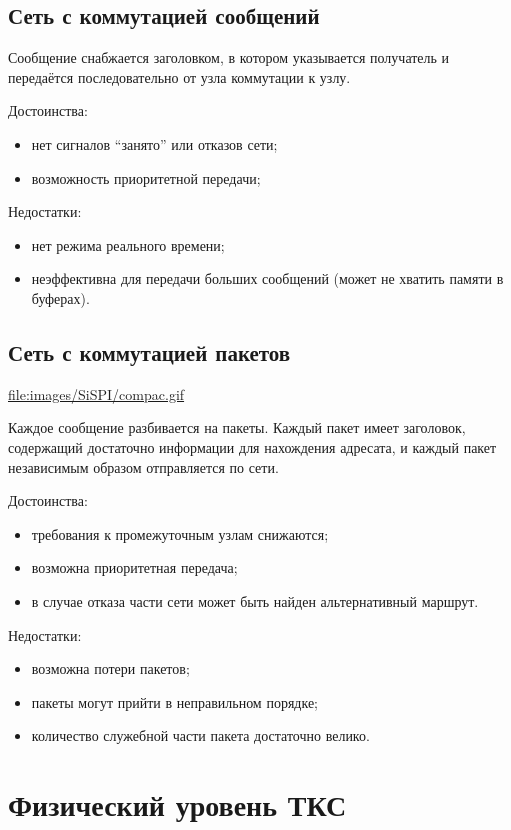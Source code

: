 \documentclass[12pt, russian, oneside, article]{ncc}
\begin{document}
\subsection{Сеть с коммутацией сообщений}
\label{sec-3_2}


Сообщение снабжается заголовком, в котором указывается получатель и передаётся последовательно от узла коммутации к узлу.

Достоинства:
\begin{itemize}
\item нет сигналов ``занято'' или отказов сети;
\item возможность приоритетной передачи;
\end{itemize}

Недостатки:
\begin{itemize}
\item нет режима реального времени;
\item неэффективна для передачи больших сообщений (может не хватить памяти в буферах).
\end{itemize}
\subsection{Сеть с коммутацией пакетов}
\label{sec-3_3}


\href{file://~/Documents/Git/lectures/otherimages/SiSPI/compac.gif}{file:images/SiSPI/compac.gif}

Каждое сообщение разбивается на пакеты. Каждый пакет имеет заголовок, содержащий достаточно информации для нахождения адресата, и каждый пакет независимым образом отправляется по сети.

Достоинства:
\begin{itemize}
\item требования к промежуточным узлам снижаются;
\item возможна приоритетная передача;
\item в случае отказа части сети может быть найден альтернативный маршрут.
\end{itemize}

Недостатки:
\begin{itemize}
\item возможна потери пакетов;
\item пакеты могут прийти в неправильном порядке;
\item количество служебной части пакета достаточно велико.
\end{itemize}
\section{Физический уровень ТКС}
\label{sec-4}
\end{document}
